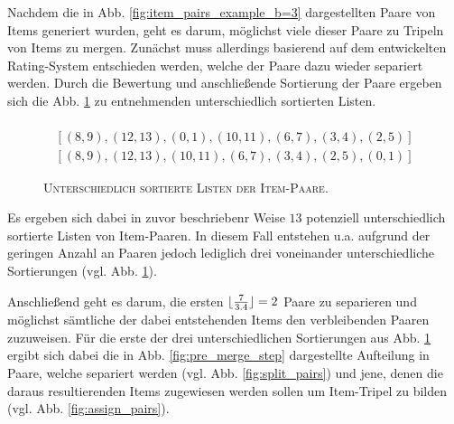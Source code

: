 Nachdem die in Abb. \ref{fig:item_pairs_example_b=3} dargestellten Paare von Items generiert wurden, geht es darum,
möglichst viele dieser Paare zu Tripeln von Items zu mergen. Zunächst muss allerdings basierend auf dem entwickelten Rating-System
entschieden werden, welche der Paare dazu wieder separiert werden. Durch die Bewertung und anschließende Sortierung der Paare
ergeben sich die Abb. \ref{fig:lists_of_pairs} zu entnehmenden unterschiedlich sortierten Listen.
\begin{figure}[H]
\begin{gather*}
  [(12, 13), (10, 11), (8, 9), (6, 7), (3, 4), (2, 5), (0, 1)] \\
  [(8, 9), (12, 13), (0, 1), (10, 11), (6, 7), (3, 4), (2, 5)] \\
  [(8, 9), (12, 13), (10, 11), (6, 7), (3, 4), (2, 5), (0, 1)]
\end{gather*}
\caption{\textsc{Unterschiedlich sortierte Listen der Item-Paare}.}
\label{fig:lists_of_pairs}
\end{figure}
Es ergeben sich dabei in zuvor beschriebenr Weise $13$ potenziell unterschiedlich sortierte Listen von Item-Paaren.
In diesem Fall entstehen u.a. aufgrund der geringen Anzahl an Paaren jedoch lediglich drei voneinander unterschiedliche
Sortierungen (vgl. Abb. \ref{fig:lists_of_pairs}).

Anschließend geht es darum, die ersten $\lfloor\frac{7}{3.4}\rfloor = 2$ Paare zu separieren und möglichst sämtliche der dabei entstehenden
Items den verbleibenden Paaren zuzuweisen. Für die erste der drei unterschiedlichen Sortierungen aus Abb. \ref{fig:lists_of_pairs}
ergibt sich dabei die in Abb. \ref{fig:pre_merge_step} dargestellte Aufteilung in Paare, welche separiert werden
(vgl. Abb. \ref{fig:split_pairs}) und jene, denen die daraus resultierenden Items zugewiesen werden sollen um Item-Tripel zu bilden
(vgl. Abb. \ref{fig:assign_pairs}).

